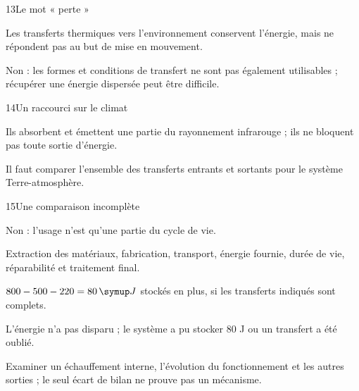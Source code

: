 \par\noindent\begin{minipage}{\linewidth}
\begin{corrige}{13}{Le mot « perte »}
\begin{questions}
\item Les transferts thermiques vers l’environnement conservent l’énergie, mais ne répondent pas au but de mise en mouvement.
\item Non : les formes et conditions de transfert ne sont pas également utilisables ; récupérer une énergie dispersée peut être difficile.
\end{questions}
\end{corrige}
\end{minipage}
\par\noindent\begin{minipage}{\linewidth}
\begin{corrige}{14}{Un raccourci sur le climat}
\begin{questions}
\item Ils absorbent et émettent une partie du rayonnement infrarouge ; ils ne bloquent pas toute sortie d’énergie.
\item Il faut comparer l’ensemble des transferts entrants et sortants pour le système Terre-atmosphère.
\end{questions}
\end{corrige}
\end{minipage}
\par\noindent\begin{minipage}{\linewidth}
\begin{corrige}{15}{Une comparaison incomplète}
\begin{questions}
\item Non : l’usage n’est qu’une partie du cycle de vie.
\item Extraction des matériaux, fabrication, transport, énergie fournie, durée de vie, réparabilité et traitement final.
\end{questions}
\end{corrige}
\end{minipage}
\clearpage
\par\noindent\begin{minipage}{\linewidth}
\label{cor-defi-12}\begin{questions}
\item $800-500-220=80\unite J$ stockés en plus, si les transferts indiqués sont complets.
\item L’énergie n’a pas disparu ; le système a pu stocker 80 J ou un transfert a été oublié.
\item Examiner un échauffement interne, l’évolution du fonctionnement et les autres sorties ; le seul écart de bilan ne prouve pas un mécanisme.
\end{questions}
\end{minipage}
